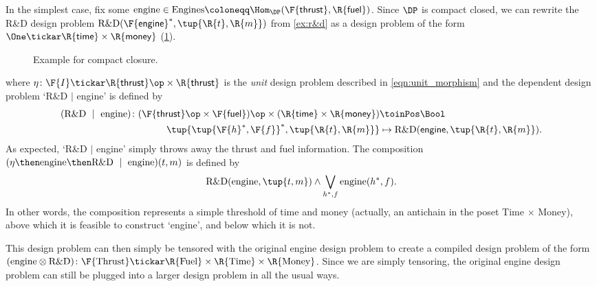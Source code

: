 \begin{example}\label{ex:r&dproblem}
In the simplest case, fix some $\text{engine} \in \text{Engines} \coloneqq \Hom_\DP(\F{\mathsf{thrust}},\R{\mathsf{fuel}})$. Since $\DP$ is compact closed, we can rewrite the R\&D design problem $\text{R\&D}(\F{\mathsf{engine}}^*, \tup{\R{t},\R{m}})$ from \cref{ex:r&d} as a design problem of the form $\One \tickar \R{\mathsf{time}} \times\R{\mathsf{money}}$ (\cref{fig:excompactclosed}).

\begin{figure}[h!]
\begin{center}
\end{center}
\caption{Example for compact closure. \label{fig:excompactclosed}}
\end{figure}
where $\eta \colon \F{I} \tickar \R{\mathsf{thrust}}\op \times \R{\mathsf{thrust}}$ is the \emph{unit} design problem described in \cref{eqn:unit_morphism} and the dependent design problem `R\&D $\mid$ engine' is defined by
\begin{equation}
\begin{aligned}
(\text{R\&D } \mid \text{ engine}) \colon (\F{\mathsf{thrust}}\op \times \F{\mathsf{fuel}})\op \times (\R{\mathsf{time}} \times \R{\mathsf{money}}) &\toinPos \Bool \\
\tup{\tup{\F{h}^*, \F{f}}^*, \tup{\R{t},\R{m}}} &\mapsto \text{R\&D}(\mathsf{engine}, \tup{\R{t},\R{m}}).
\end{aligned}
\end{equation}
As expected, `R\&D $|$ engine' simply throws away the thrust and fuel information. The composition $(\eta \then \text{engine} \then \text{R\&D } \mid \text{ engine}) (t,m)$ is defined by
\begin{equation}
    \text{R\&D}(\text{engine}, \tup{t,m}) \wedge \bigvee_{h^*,f} \text{engine}(h^*, f).
\end{equation} 
In other words, the composition represents a simple threshold of time and money (actually, an antichain in the poset Time $\times$ Money), above which it is feasible to construct `engine', and below which it is not.

This design problem can then simply be tensored with the original engine design problem to create a compiled design problem of the form $(\text{engine} \otimes \text{R\&D}) \colon \F{\text{Thrust}} \tickar \R{\text{Fuel}} \times \R{\text{Time}} \times \R{\text{Money}}$. Since we are simply tensoring, the original engine design problem can still be plugged into a larger design problem in all the usual ways.
\end{example}
